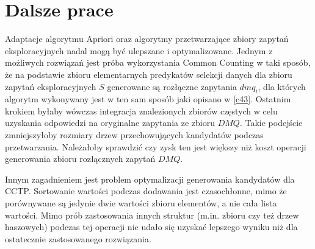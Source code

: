 \section{Dalsze prace}
\label{c54}
Adaptacje algorytmu Apriori oraz algorytmy przetwarzające zbiory zapytań eksploracyjnych nadal mogą być ulepszane i optymalizowane. Jednym z możliwych rozwiązań jest próba wykorzystania Common Counting w taki sposób, że na podstawie zbioru elementarnych predykatów selekcji danych dla zbioru zapytań eksploracyjnych \(S\) generowane są rozłączne zapytania \(dmq_i\), dla których algorytm wykonywany jest w ten sam sposób jaki opisano w \ref{c43}. Ostatnim krokiem byłaby wówczas integracja znalezionych zbiorów częstych w celu uzyskania odpowiedzi na oryginalne zapytania ze zbioru \(DMQ\). Takie podejście zmniejszyłoby rozmiary drzew przechowujących kandydatów podczas przetwarzania. Należałoby sprawdzić czy zysk ten jest większy niż koszt operacji generowania zbioru rozłącznych zapytań \(DMQ\). 

Innym zagadnieniem jest problem optymalizacji generowania kandydatów dla CCTP. Sortowanie wartości podczas dodawania jest czasochłonne, mimo że porównywane są jedynie dwie wartości zbioru elementów, a nie cała lista wartości. Mimo prób zastosowania innych struktur (m.in. zbioru czy też drzew haszowych) podczas tej operacji nie udało się uzyskać lepszego wyniku niż dla ostatecznie zastosowanego rozwiązania. 